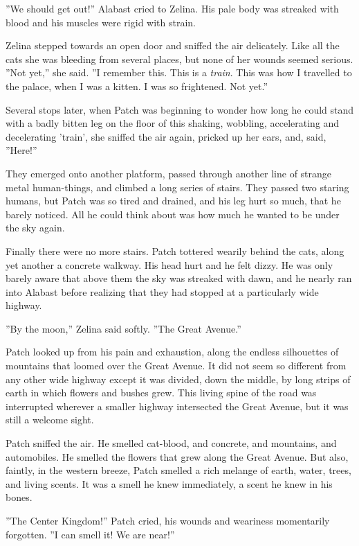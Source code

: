 \documentclass[12pt]{book}
\begin{document}
 ''We should get out!'' Alabast cried to Zelina. His pale body was streaked with blood and his muscles were rigid with strain.\par
 Zelina stepped towards an open door and sniffed the air delicately. Like all the cats she was bleeding from several places, but none of her wounds seemed serious. ''Not yet,'' she said. ''I remember this. This is a {\it train}. This was how I travelled to the palace, when I was a kitten. I was so frightened. Not yet.''\par
 Several stops later, when Patch was beginning to wonder how long he could stand with a badly bitten leg on the floor of this shaking, wobbling, accelerating and decelerating 'train', she sniffed the air again, pricked up her ears, and, said, ''Here!''\par
 They emerged onto another platform, passed through another line of strange metal human-things, and climbed a long series of stairs. They passed two staring humans, but Patch was so tired and drained, and his leg hurt so much, that he barely noticed. All he could think about was how much he wanted to be under the sky again.\par
 Finally there were no more stairs. Patch tottered wearily behind the cats, along yet another a concrete walkway. His head hurt and he felt dizzy. He was only barely aware that above them the sky was streaked with dawn, and he nearly ran into Alabast before realizing that they had stopped at a particularly wide highway.\par
 ''By the moon,'' Zelina said softly. ''The Great Avenue.''\par
 Patch looked up from his pain and exhaustion, along the endless silhouettes of mountains that loomed over the Great Avenue. It did not seem so different from any other wide highway %
 except it was divided, down the middle, by long strips of earth in which flowers and bushes grew. This living spine of the road was interrupted wherever a smaller highway intersected the Great Avenue, but it was still a welcome sight.\par
Patch sniffed the air. He smelled cat-blood, and concrete, and mountains, and automobiles. He smelled the flowers that grew along the Great Avenue. But also, faintly, in the western breeze, Patch smelled a rich melange of earth, water, trees, and living scents. It was a smell he knew immediately, a scent he knew in his bones.\par
''The Center Kingdom!'' Patch cried, his wounds and weariness momentarily forgotten. ''I can smell it! We are near!''\par
\end{document}
